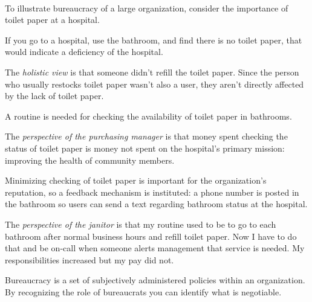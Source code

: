 \ \\
To illustrate bureaucracy of a large organization, consider the importance of toilet paper at a hospital. 
\begin{mdframed}[frametitle={Restocking Toilet Paper},frametitlerule=true,frametitlealignment=\centering]
If you go to a hospital, use the bathroom, and find there is no toilet paper, that would indicate a deficiency of the hospital.

The \textit{holistic view} is that someone didn't refill the toilet paper. Since the person who usually restocks toilet paper wasn't also a user, they aren't directly affected by the lack of toilet paper.

A routine is needed for checking the availability of toilet paper in bathrooms. 

The \textit{perspective of the purchasing manager} is that money spent checking the status of toilet paper is money not spent on the hospital's primary mission: improving the health of community members.

Minimizing checking of toilet paper is important for the organization's reputation, so a feedback mechanism is instituted: a phone number is posted in the bathroom so users can send a text regarding bathroom status at the hospital.

The \textit{perspective of the janitor} is that my routine used to be to go to each bathroom after normal business hours and refill toilet paper. Now I have to do that and be on-call when someone alerts management that service is needed. My responsibilities increased but my pay did not.

\end{mdframed}






Bureaucracy is a set of subjectively administered policies within an organization. By recognizing the role of bureaucrats you can identify what is negotiable. 
